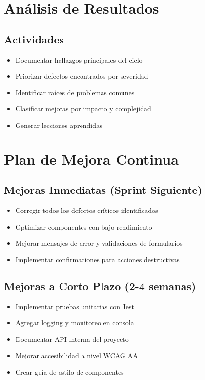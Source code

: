 \documentclass[12pt,a4paper]{report}
\begin{document}
\section{Análisis de Resultados}

\subsection{Actividades}
\begin{itemize}
    \item Documentar hallazgos principales del ciclo
    \item Priorizar defectos encontrados por severidad
    \item Identificar raíces de problemas comunes
    \item Clasificar mejoras por impacto y complejidad
    \item Generar lecciones aprendidas
\end{itemize}

\section{Plan de Mejora Continua}

\subsection{Mejoras Inmediatas (Sprint Siguiente)}

\begin{itemize}
    \item Corregir todos los defectos críticos identificados
    \item Optimizar componentes con bajo rendimiento
    \item Mejorar mensajes de error y validaciones de formularios
    \item Implementar confirmaciones para acciones destructivas
\end{itemize}

\subsection{Mejoras a Corto Plazo (2-4 semanas)}

\begin{itemize}
    \item Implementar pruebas unitarias con Jest
    \item Agregar logging y monitoreo en consola
    \item Documentar API interna del proyecto
    \item Mejorar accesibilidad a nivel WCAG AA
    \item Crear guía de estilo de componentes
\end{itemize}
\end{document}
